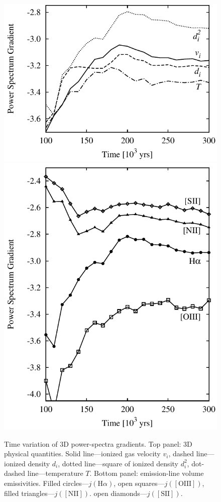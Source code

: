 \documentclass[useAMS,usenatbib]{mn2e}
\begin{document}
\begin{figure}
\centering
\includegraphics[width=\linewidth]{afkz1}\\
\includegraphics[width=\linewidth]{ef1kmp}
\caption{Time variation of 3D power-spectra gradients. Top panel: 3D physical
  quantities. Solid line---ionized
  gas velocity $v_i$, dashed line---ionized density $d_i$, dotted line---square of ionized density $d_i^2$,
  dot-dashed line---temperature $T$. Bottom panel: emission-line
  volume emissivities. Filled circles---$j(\mathrm{H}\alpha)$, open
  squares---$j(\mathrm{[OIII]})$, filled
  triangles---$j(\mathrm{[NII]})$. open diamonds---$j(\mathrm{[SII]})$.}
\label{fig:psevol}
\end{figure}
\end{document}
